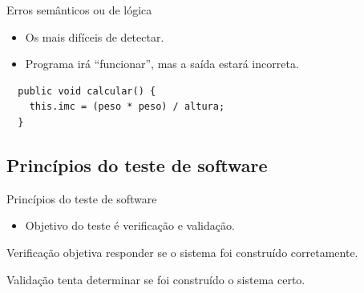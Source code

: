 \documentclass[handout]{beamer}
\begin{document}
\begin{frame}[fragile]{Erros semânticos ou de lógica}

\begin{itemize}
\item Os mais difíceis de detectar. 
\item Programa irá ``funcionar'', mas a saída estará incorreta.
\end{itemize}

\begin{lstlisting}
  public void calcular() {
    this.imc = (peso * peso) / altura;
  }
\end{lstlisting}

\end{frame}


\subsection{Princípios do teste de software}

\begin{frame}{Princípios do teste de software}

\begin{itemize}
\item Objetivo do teste é verificação e validação.
\end{itemize}

\begin{block}{Verificação}
objetiva responder se o sistema foi construído corretamente.
\end{block}

\begin{block}{Validação}
tenta determinar se foi construído o sistema certo.
\end{block}

\end{frame}
\end{document}
